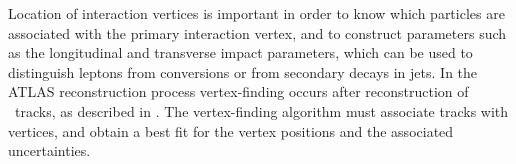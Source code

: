 Location of interaction vertices is 
important in order to know which particles are
associated with the primary interaction vertex, and to construct parameters such as the
longitudinal and transverse impact parameters, which can be used to distinguish 
leptons from conversions or from secondary decays in jets.
In the ATLAS reconstruction process vertex-finding occurs after reconstruction of
\id\ tracks, as described in . The
vertex-finding algorithm must associate tracks with vertices, and obtain
a best fit for the vertex positions and the associated uncertainties.

%


